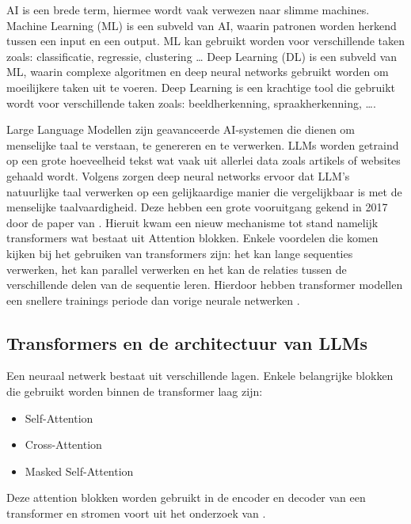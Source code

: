 AI is een brede term, hiermee wordt vaak verwezen naar slimme machines. 
Machine Learning (ML) is een subveld van AI, waarin patronen worden herkend tussen een input en een output.
ML kan gebruikt worden voor verschillende taken zoals: classificatie, regressie, clustering \dots
Deep Learning (DL) is een subveld van ML, waarin complexe algoritmen en deep neural networks gebruikt worden om moeilijkere taken uit te voeren.
Deep Learning is een krachtige tool die gebruikt wordt voor verschillende taken zoals: beeldherkenning, spraakherkenning, \dots \autocite{Stoeffelbauer2023}.

Large Language Modellen zijn geavanceerde AI-systemen die dienen om menselijke taal te verstaan, te genereren en te verwerken.
LLMs worden getraind op een grote hoeveelheid tekst wat vaak uit allerlei data zoals artikels of websites gehaald wordt. 
Volgens \textcite{Beelen2023} zorgen deep neural networks ervoor dat LLM's natuurlijke taal verwerken op een gelijkaardige manier die vergelijkbaar is met de menselijke taalvaardigheid.
Deze hebben een grote vooruitgang gekend in 2017 door de paper van \textcite{VaswaniEtAl2017}. 
Hieruit kwam een nieuw mechanisme tot stand namelijk transformers wat bestaat uit Attention blokken. 
Enkele voordelen die komen kijken bij het gebruiken van transformers zijn: het kan lange sequenties verwerken, het kan parallel verwerken en het kan de relaties tussen de verschillende delen van de sequentie leren.
Hierdoor hebben transformer modellen een snellere trainings periode dan vorige neurale netwerken \autocite{aiml2023}.

\subsection{Transformers en de architectuur van LLMs}
\label{sec:architectuur-van-llms}
Een neuraal netwerk bestaat uit verschillende lagen. Enkele belangrijke blokken die gebruikt worden binnen de transformer laag zijn:
\begin{itemize}
  \item Self-Attention
  \item Cross-Attention
  \item Masked Self-Attention
\end{itemize}

Deze attention blokken worden gebruikt in de encoder en decoder van een transformer en stromen voort uit het onderzoek van \textcite{VaswaniEtAl2017}.

